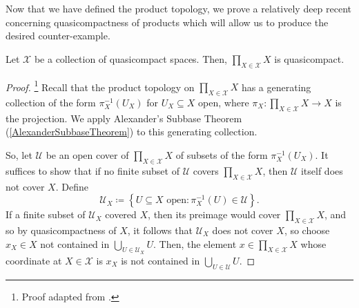 Now that we have defined the product topology, we prove a relatively deep recent concerning quasicompactness of products which will allow us to produce the desired counter-example.
\begin{thm}\label{TychnoffsTheorem}
Let $\mathcal{X}$ be a collection of quasicompact spaces.  Then, $\prod _{X\in \mathcal{X}}X$ is quasicompact.
\begin{proof}\footnote{Proof adapted from \cite[pg.~143]{Kelley}.}
Recall that the product topology on $\prod _{X\in \mathcal{X}}X$ has a generating collection of the form $\pi _X^{-1}(U_X)$ for $U_X\subseteq X$ open, where $\pi _X:\prod _{X\in \mathcal{X}}X\rightarrow X$ is the projection.  We apply Alexander's Subbase Theorem (\cref{AlexanderSubbaseTheorem}) to this generating collection.

So, let $\mathcal{U}$ be an open cover of $\prod _{X\in \mathcal{X}}X$ of subsets of the form $\pi _X^{-1}(U_X)$.  It suffices to show that if no finite subset of $\mathcal{U}$ covers $\prod _{X\in \mathcal{X}}X$, then $\mathcal{U}$ itself does not cover $X$.  Define
\begin{equation}
\mathcal{U}_X\coloneqq \left\{ U\subseteq X\text{ open}:\pi _X^{-1}(U)\in \mathcal{U}\right\} .
\end{equation}
If a finite subset of $\mathcal{U}_X$ covered $X$, then its preimage would cover $\prod _{X\in \mathcal{X}}X$, and so by quasicompactness of $X$, it follows that $\mathcal{U}_X$ does not cover $X$, so choose $x_X\in X$ not contained in $\bigcup _{U\in \mathcal{U}_X}U$.  Then, the element $x\in \prod _{X\in \mathcal{X}}X$ whose coordinate at $X\in \mathcal{X}$ is $x_X$ is not contained in $\bigcup _{U\in \mathcal{U}}U$.
\end{proof}
\end{thm}

